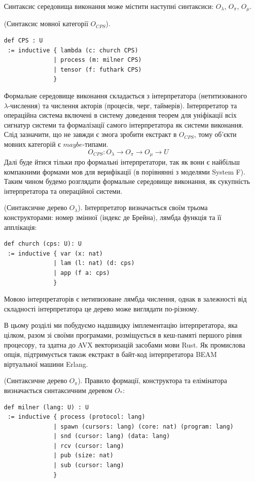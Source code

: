 Синтаксис середовища виконання може містити наступні синтаксиси:
$O_\lambda$, $O_\pi$, $O_\mu$.

\begin{definition} (Синтаксис мовної категорії $O_{CPS}$).
\begin{lstlisting}
def CPS : U
 := inductive { lambda (c: church CPS)
              | process (m: milner CPS)
              | tensor (f: futhark CPS)
              }
\end{lstlisting}
\end{definition}

Формальне середовище виконання складається з інтерпретатора
(нетитизованого $\lambda$-числення) та числення акторів (процесів, черг, таймерів).
Інтерпретатор та операційна система включені в систему доведення теорем
для уніфікації всіх сигнатур системи та формалізації самого інтерпретатора
як системи виконання. Слід зазначити, що не
завжди є змога зробити екстракт в $O_{CPS}$, тому об'єкти мовних
категорій є $maybe$-типами.
$$
O_{CPS}: O_\lambda \rightarrow O_\pi \rightarrow O_\mu \rightarrow U
$$
Далі буде йтися тільки про формальні інтерпретатори,
так як вони є найбільш компакними формами мов для
верифікації (в порівнянні з моделями System F).
Таким чином будемо розглядати формальне середовище виконання, як
сукупність інтерпретатора та операційної системи.

\begin{definition} (Синтаксичне дерево $O_\lambda$). Інтерпретатор визначається
своїм трьома конструкторами: номер змінної (індекс де Брейна),
лямбда функція та її апплікація:
\begin{lstlisting}
def church (cps: U): U
 := inductive { var (x: nat)
              | lam (l: nat) (d: cps)
              | app (f a: cps)
              }
\end{lstlisting}
Мовою інтерпретаторів є нетипизоване лямбда числення, однак в залежності
від складності інтерпретатора це дерево може виглядати по-різному.
\end{definition}

В цьому розділі ми побудуємо надшвидку імплементацію інтерпретатора,
яка цілком, разом зі своїми програмами, розміщується в кеш-памяті
першого рівня процесору, та здатна до AVX векторизацій засобами мови Rust.
Як промислова опція, підтримується також екстракт
в байт-код інтерпретатора BEAM віртуальної машини Erlang.

\begin{definition} (Синтаксичне дерево $O_\pi$).
Правило формації, конструктора та елімінатора визначається синтаксичним деревом $O_*$:
\begin{lstlisting}
def milner (lang: U) : U
 := inductive { process (protocol: lang)
              | spawn (cursors: lang) (core: nat) (program: lang)
              | snd (cursor: lang) (data: lang)
              | rcv (cursor: lang)
              | pub (size: nat)
              | sub (cursor: lang)
              }
\end{lstlisting}
\end{definition}

